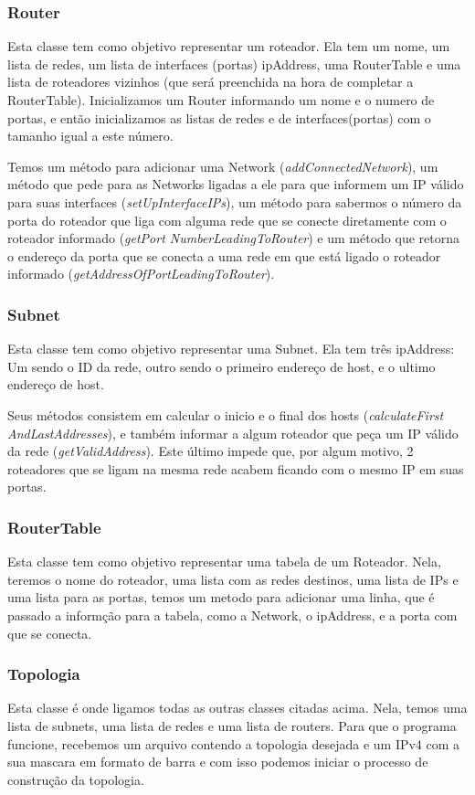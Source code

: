 \documentclass[12pt]{article}
\begin{document}
\subsubsection{Router}
Esta classe tem como objetivo representar um roteador. Ela tem um nome, um lista de redes, um lista de interfaces (portas) ipAddress, uma RouterTable e uma lista de roteadores vizinhos (que será preenchida na hora de completar a RouterTable).  Inicializamos um Router informando um nome e o numero de portas, e então inicializamos as listas de redes e de interfaces(portas) com o tamanho igual a este número.

Temos um método para adicionar uma Network (\textit{addConnectedNetwork}), um método que pede para as Networks ligadas a ele para que informem um IP válido para suas interfaces (\textit{setUpInterfaceIPs}), um método para sabermos o número da porta do roteador que liga com alguma rede que se conecte diretamente com o roteador informado (\textit{getPort NumberLeadingToRouter}) e um método que retorna o endereço da porta que se conecta a uma rede em que está ligado o roteador informado (\textit{getAddressOfPortLeadingToRouter}).

\subsubsection{Subnet}
Esta classe tem como objetivo representar uma Subnet. Ela tem três ipAddress: Um sendo o ID da rede, outro sendo o primeiro endereço de host, e o ultimo endereço de host.

Seus métodos consistem em calcular o inicio e o final dos hosts (\textit{calculateFirst AndLastAddresses}), e  também informar a algum roteador que peça um IP válido da rede (\textit{getValidAddress}). Este último impede que, por algum motivo, 2 roteadores que se ligam na mesma rede acabem ficando com o mesmo IP em suas portas.

\subsubsection{RouterTable}
Esta classe tem como objetivo representar uma tabela de um Roteador. Nela, teremos o nome do roteador, uma lista com as redes destinos, uma lista de IPs e uma lista para as portas, temos um metodo para adicionar uma linha, que é passado a informção para a tabela, como a Network, o ipAddress, e a porta com que se conecta.

\subsubsection{Topologia}
Esta classe é onde ligamos todas as outras classes citadas acima. Nela, temos uma lista de subnets, uma lista de redes e uma lista de routers. Para que o programa funcione, recebemos um arquivo contendo a topologia desejada e um IPv4 com a sua mascara em formato de barra e com isso podemos iniciar o processo de construção da topologia.
\end{document}
